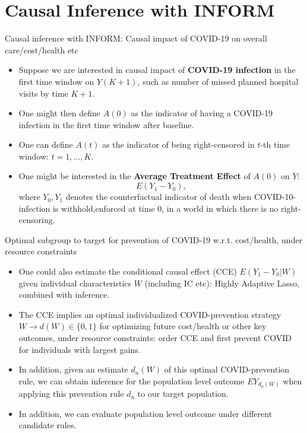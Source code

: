 \documentclass[t]{beamer}
\begin{document}
\section{Causal Inference with INFORM}

\begin{frame}{Causal inference with INFORM: Causal impact of COVID-19 on overall care/cost/health etc}
\begin{itemize}
\item Suppose we are interested in causal impact of {\bf COVID-19 infection} in the first time window on  $Y(K+1)$, such as number of missed planned hospital visits by time $K+1$.  
\item One might then define $A(0)$ as the indicator of having a COVID-19 infection in the first time window after baseline. 
\item One can define $A(t)$ as the indicator of being right-censored in $t$-th time window: $t=1,\ldots,K$. 
\item One might be interested in the {\bf Average Treatment Effect} of $A(0)$ on $Y$:
\[
E(Y_{1}-Y_0),\]
where $Y_0,Y_1$ denotes the counterfactual indicator of death when COVID-10-infection is 
withhold,enforced at time $0$, in a world in which there is no right-censoring.
\end{itemize}
\end{frame}
\begin{frame}{Optimal subgroup to target for prevention of COVID-19 w.r.t. cost/health, under resource constraints}
\begin{itemize}
\item One could also estimate the conditional causal effect (CCE) $E(Y_1-Y_0|W)$  given individual characteristics $W$ (including IC etc): Highly Adaptive Lasso, combined with inference.
\item The CCE implies an optimal individualized COVID-prevention strategy $W\rightarrow d(W)\in \{0,1\}$ for optimizing future cost/health or other key outcomes,  under resource constraints: order CCE and first prevent COVID for individuals with largest gains. 
\item In addition, given an estimate $d_n(W)$ of this optimal COVID-prevention rule, we can obtain inference for the population level outcome $EY_{d_n(W)}$ when applying this prevention rule $d_n$ to our target population. 
\item In addition, we can evaluate population level outcome under different candidate rules. 
\end{itemize}
\end{frame}
\end{document}
